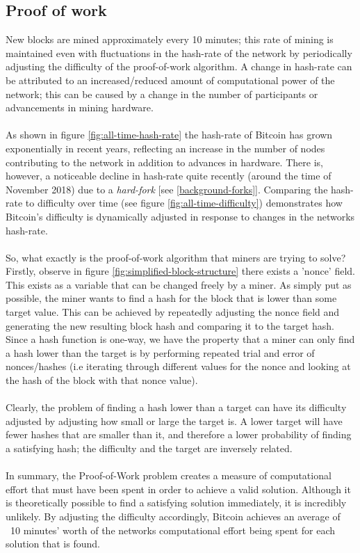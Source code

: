 \subsection{Proof of work}\label{background-proof-of-work}
New blocks are mined approximately every 10 minutes; this rate of mining is maintained even with fluctuations in the hash-rate of the network by periodically adjusting the difficulty of the proof-of-work algorithm. A change in hash-rate can be attributed to an increased/reduced amount of computational power of the network; this can be caused by a change in the number of participants or advancements in mining hardware.
\\\\
As shown in figure \ref{fig:all-time-hash-rate} the hash-rate of Bitcoin has grown exponentially in recent years, reflecting an increase in the number of nodes contributing to the network in addition to advances in hardware. There is, however, a noticeable decline in hash-rate quite recently (around the time of November 2018) due to a \textit{hard-fork} [see \ref{background-forks}]. Comparing the hash-rate to difficulty over time (see figure \ref{fig:all-time-difficulty}) demonstrates how Bitcoin's difficulty is dynamically adjusted in response to changes in the networks hash-rate. 
\\\\
So, what exactly is the proof-of-work algorithm that miners are trying to solve? Firstly, observe in figure \ref{fig:simplified-block-structure} there exists a 'nonce' field. This exists as a variable that can be changed freely by a miner. As simply put as possible, the miner wants to find a hash for the block that is lower than some target value. This can be achieved by repeatedly adjusting the nonce field and generating the new resulting block hash and comparing it to the target hash. Since a hash function is one-way, we have the property that a miner can only find a hash lower than the target is by performing repeated trial and error of nonces/hashes (i.e iterating through different values for the nonce and looking at the hash of the block with that nonce value).
\\\\
Clearly, the problem of finding a hash lower than a target can have its difficulty adjusted by adjusting how small or large the target is. A lower target will have fewer hashes that are smaller than it, and therefore a lower probability of finding a satisfying hash; the difficulty and the target are inversely related. 
\\\\
In summary, the Proof-of-Work problem creates a measure of computational effort that must have been spent in order to achieve a valid solution. Although it is theoretically possible to find a satisfying solution immediately, it is incredibly unlikely. By adjusting the difficulty accordingly, Bitcoin achieves an average of ~10 minutes' worth of the networks computational effort being spent for each solution that is found. 


